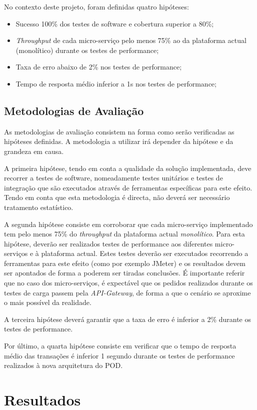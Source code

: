 No contexto deste projeto, foram definidas quatro hipóteses:
\begin{itemize}
    \item Sucesso 100\% dos testes de software e cobertura superior a 80\%;
    \item \emph{Throughput} de cada micro-serviço pelo menos 75\% ao da plataforma actual (monolítico) durante os testes de performance;
    \item Taxa de erro abaixo de 2\% nos testes de performance;
    \item Tempo de resposta médio inferior a 1s nos testes de performance;
\end{itemize}

\subsection{Metodologias de Avaliação}
As metodologias de avaliação consistem na forma como serão verificadas as hipóteses definidas. A metodologia a utilizar irá depender da hipótese e da grandeza em causa.

A primeira hipótese, tendo em conta a qualidade da solução implementada, deve recorrer a testes de software, nomeadamente testes unitários e testes de integração que são executados através de ferramentas específicas para este efeito. Tendo em conta que esta metodologia é directa, não deverá ser necessário tratamento estatístico.

A segunda hipótese consiste em corroborar que cada micro-serviço implementado tem pelo menos 75\% do \emph{throughput} da plataforma actual \emph{monolítico}. Para esta hipótese, deverão ser realizados testes de performance aos diferentes micro-serviços e à plataforma actual. Estes testes deverão ser executados recorrendo a ferramentas para este efeito (como por exemplo JMeter) e os resultados devem ser apontados de forma a poderem ser tiradas conclusões. É importante referir que no caso dos micro-serviços, é expectável que os pedidos realizados durante os testes de carga passem pela \emph{API-Gateway}, de forma a que o cenário se aproxime o mais possível da realidade.

A terceira hipótese deverá garantir que a taxa de erro é inferior a 2\% durante os testes de performance.

Por último, a quarta hipótese consiste em verificar que o tempo de resposta médio das transações é inferior 1 segundo durante os testes de performance realizados à nova arquitetura do POD.

\section{Resultados}